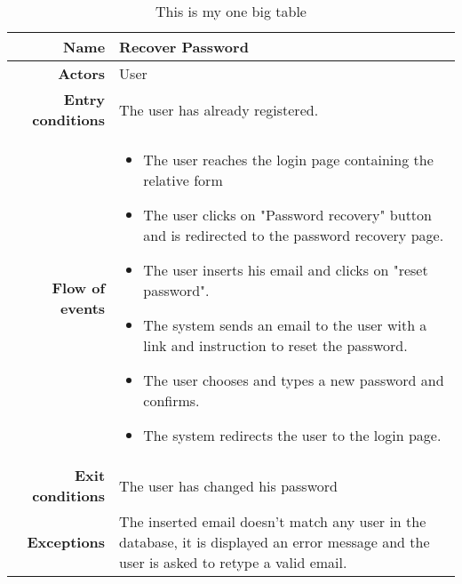 \begin{table}[htp]
\begin{tabular}{r|p{7cm}}
\bf\large Name&\bf\large Recover Password \\
\hline
\hline
\bf Actors&User\\
\hline
\bf Entry conditions&The user has already registered.\\
\hline
\bf Flow of events&
\begin{itemize}
\item The user reaches the login page containing the relative form
\item The user clicks on "Password recovery" button and is redirected to the password recovery page.
\item The user inserts his email and clicks on "reset password".
\item The system sends an email to the user with a link and instruction to reset the password.
\item The user chooses and types a new password and confirms.
\item The system redirects the user to the login page.
\end{itemize}
\\
\hline
\bf Exit conditions&The user has changed his password \\
\hline
\bf Exceptions&The inserted email doesn't match any user in the database, it is displayed an error message and the user is asked to retype a valid email.\\
\hline

\end{tabular}
\caption{This is my one big table} \label{tab:recoverpassword}
\end{table}